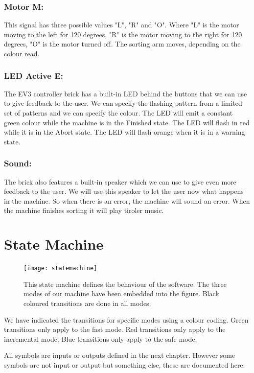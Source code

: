 \documentclass[a4paper,oneside,11pt]{article}
\begin{document}
\subsubsection{Motor M:} This signal has three possible values "L", "R" and "O". Where "L" is the motor moving to the left for 120 degrees, "R" is the motor moving to the right for 120 degrees, "O" is the motor turned off. The sorting arm moves, depending on the colour read.
\subsubsection{LED Active E:} The EV3 controller brick has a built-in LED behind the buttons that we can use to give feedback to the user. We can specify the flashing pattern from a limited set of patterns and we can specify the colour. The LED will emit a constant green colour while the machine is in the Finished state. The LED will flash in red while it is in the Abort state. The LED will flash orange when it is in a warning state.
\subsubsection{Sound:} The brick also features a built-in speaker which we can use to give even more feedback to the user. We will use this speaker to let the user now what happens in the machine. So when there is an error, the machine will sound an error. When the machine finishes sorting it will play tiroler music.

\section{State Machine}
\begin{figure}[H]
	\centering
	\texttt{[image: statemachine]}
	\caption{This state machine defines the behaviour of the software. The three modes of our machine have been embedded into the figure. Black coloured transitions are done in all modes.}
\end{figure}
We have indicated the transitions for specific modes using a colour coding. Green transitions only apply to the fast mode. Red transitions only apply to the incremental mode. Blue transitions only apply to the safe mode. 

All symbols are inputs or outputs defined in the next chapter. However some symbols are not input or output but something else, these are documented here:
\end{document}
